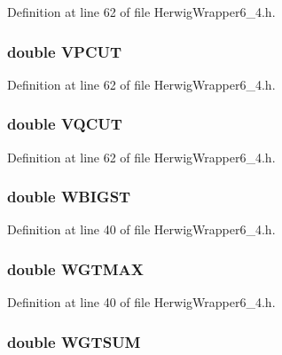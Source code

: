 Definition at line 62 of file Herwig\-Wrapper6\_\-4.h.
\subsubsection{\setlength{\rightskip}{0pt plus 5cm}double {\bf VPCUT}}\label{HerwigWrapper6__4_8h_ff877ca6031c141086529616b79244c0}




Definition at line 62 of file Herwig\-Wrapper6\_\-4.h.
\subsubsection{\setlength{\rightskip}{0pt plus 5cm}double {\bf VQCUT}}\label{HerwigWrapper6__4_8h_81b752559cdcd137cc9d8bcd36597f3a}




Definition at line 62 of file Herwig\-Wrapper6\_\-4.h.
\subsubsection{\setlength{\rightskip}{0pt plus 5cm}double {\bf WBIGST}}\label{HerwigWrapper6__4_8h_9397a1de5a6849954edea38abfcd81eb}




Definition at line 40 of file Herwig\-Wrapper6\_\-4.h.
\subsubsection{\setlength{\rightskip}{0pt plus 5cm}double {\bf WGTMAX}}\label{HerwigWrapper6__4_8h_72d2bda7469526dc4865b38936ed0148}




Definition at line 40 of file Herwig\-Wrapper6\_\-4.h.
\subsubsection{\setlength{\rightskip}{0pt plus 5cm}double {\bf WGTSUM}}\label{HerwigWrapper6__4_8h_f63f0468737617cee97ec736aeef1d03}




